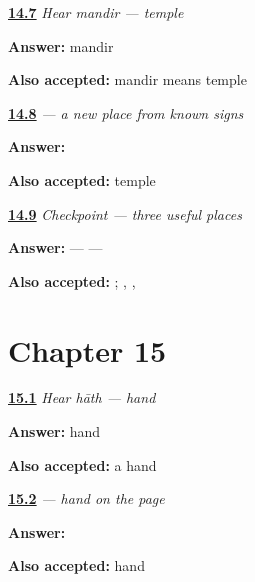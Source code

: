 \noindent\begin{minipage}[t]{\linewidth}
\raggedright
\hyperlink{review-MW-C10-hear-mandir-meaning}{\textbf{14.7}} \emph{Hear \emph{mandir} — temple}\par
\small \textbf{Answer:} mandir\par
\footnotesize \textbf{Also accepted:} mandir means temple
\end{minipage}\par\medskip

\noindent\begin{minipage}[t]{\linewidth}
\raggedright
\hyperlink{review-MW-C10-mandir-dictation}{\textbf{14.8}} \emph{ — a new place from known signs}\par
\small \textbf{Answer:} \par
\footnotesize \textbf{Also accepted:}  temple
\end{minipage}\par\medskip

\noindent\begin{minipage}[t]{\linewidth}
\raggedright
\hyperlink{review-MW-R10-places-three-payoff}{\textbf{14.9}} \emph{Checkpoint — three useful places}\par
\small \textbf{Answer:}  —  — \par
\footnotesize \textbf{Also accepted:}   ; , , 
\end{minipage}\par\medskip

\section*{Chapter 15}

\noindent\begin{minipage}[t]{\linewidth}
\raggedright
\hyperlink{review-MW-C10-hear-haath-meaning}{\textbf{15.1}} \emph{Hear \emph{hāth} — hand}\par
\small \textbf{Answer:} hand\par
\footnotesize \textbf{Also accepted:} a hand
\end{minipage}\par\medskip

\noindent\begin{minipage}[t]{\linewidth}
\raggedright
\hyperlink{review-MW-C10-haath-dictation}{\textbf{15.2}} \emph{ — hand on the page}\par
\small \textbf{Answer:} \par
\footnotesize \textbf{Also accepted:}  hand
\end{minipage}\par\medskip

